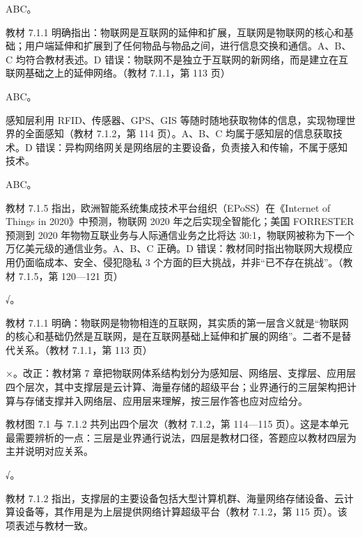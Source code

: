 \documentclass[a4paper,11pt]{article}
\begin{document}
\q ABC。\begin{analysis}教材 7.1.1 明确指出：物联网是互联网的延伸和扩展，互联网是物联网的核心和基础；用户端延伸和扩展到了任何物品与物品之间，进行信息交换和通信。A、B、C 均符合教材表述。D 错误：物联网不是独立于互联网的新网络，而是建立在互联网基础之上的延伸网络。（教材 7.1.1，第 113 页）\end{analysis}

\q ABC。\begin{analysis}感知层利用 RFID、传感器、GPS、GIS 等随时随地获取物体的信息，实现物理世界的全面感知（教材 7.1.2，第 114 页）。A、B、C 均属于感知层的信息获取技术。D 错误：异构网络网关是网络层的主要设备，负责接入和传输，不属于感知技术。\end{analysis}

\q ABC。\begin{analysis}教材 7.1.5 指出，欧洲智能系统集成技术平台组织（EPoSS）在《Internet of Things in 2020》中预测，物联网 2020 年之后实现全智能化；美国 FORRESTER 预测到 2020 年物物互联业务与人际通信业务之比将达 30:1，物联网被称为下一个万亿美元级的通信业务。A、B、C 正确。D 错误：教材同时指出物联网大规模应用仍面临成本、安全、侵犯隐私 3 个方面的巨大挑战，并非“已不存在挑战”。（教材 7.1.5，第 120—121 页）\end{analysis}


\q √。\begin{analysis}教材 7.1.1 明确：物联网是物物相连的互联网，其实质的第一层含义就是“物联网的核心和基础仍然是互联网，是在互联网基础上延伸和扩展的网络”。二者不是替代关系。（教材 7.1.1，第 113 页）\end{analysis}

\q ×。改正：教材第 7 章把物联网体系结构划分为感知层、网络层、支撑层、应用层四个层次，其中支撑层是云计算、海量存储的超级平台；业界通行的三层架构把计算与存储支撑并入网络层、应用层来理解，按三层作答也应对应给分。\begin{analysis}教材图 7.1 与 7.1.2 共列出四个层次（教材 7.1.2，第 114—115 页）。这是本单元最需要辨析的一点：三层是业界通行说法，四层是教材口径，答题应以教材四层为主并说明对应关系。\end{analysis}

\q √。\begin{analysis}教材 7.1.2 指出，支撑层的主要设备包括大型计算机群、海量网络存储设备、云计算设备等，其作用是为上层提供网络计算超级平台（教材 7.1.2，第 115 页）。该项表述与教材一致。\end{analysis}
\end{document}
